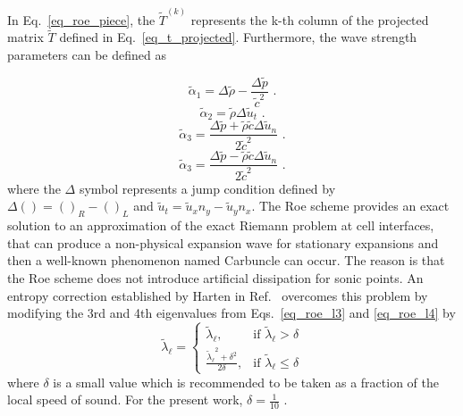 In Eq.\ \ref{eq_roe_piece}, the $\tilde{T}^{(k)}$ represents the k-th column of the projected matrix $\tilde{T}$ defined in Eq.\ \ref{eq_t_projected}. Furthermore, the wave strength parameters can be defined as

\begin{equation}
    \label{eq_roe_alpha_1}
    \tilde{\alpha}_{1} = \Delta \tilde{\rho} - \frac{\Delta \tilde{p}}{\tilde{c}^2}
    \mbox{ .}
\end{equation}
%
\begin{equation}
    \label{eq_roe_alpha_2}
    \tilde{\alpha}_{2} = \tilde{\rho} \Delta \tilde{u}_t
    \mbox{ .}
\end{equation}
%
\begin{equation}
    \label{eq_roe_alpha_3}
    \tilde{\alpha}_{3} = \frac{\Delta \tilde{p} + \tilde{\rho} \tilde{c} \Delta \tilde{u}_n}{2 \tilde{c}^2}
    \mbox{ .}
\end{equation}
%
\begin{equation}
    \label{eq_roe_alpha_4}
    \tilde{\alpha}_{3} = \frac{\Delta \tilde{p} - \tilde{\rho} \tilde{c} \Delta \tilde{u}_n}{2 \tilde{c}^2}
    \mbox{ .}
\end{equation}
where the $\Delta$ symbol represents a jump condition defined by $\Delta() = ()_R - ()_L$ and $\tilde{u}_t = \tilde{u}_x n_y - \tilde{u}_y n_x$. The Roe scheme provides an exact solution to an approximation of the exact Riemann problem at cell interfaces, that can produce a non-physical expansion wave for stationary expansions and then a well-known phenomenon named Carbuncle can occur. The reason is that the Roe scheme does not introduce artificial dissipation for sonic points. An entropy correction established by Harten in Ref.\ \cite{Harten1983} overcomes this problem by modifying the 3rd and 4th eigenvalues from Eqs.\ \ref{eq_roe_l3} and \ref{eq_roe_l4} by 
%
\begin{equation}
    \label{eq_harten_entropy}
    \tilde{\lambda}_{\ell} = 
    \begin{cases}
    	\tilde{\lambda}_{\ell},                                               & \mbox{if }  \tilde{\lambda}_{\ell} > \delta \\
    	\frac{{\tilde{\lambda}_{\ell}}^2 + \delta^2}{2\delta},  & \mbox{if }  \tilde{\lambda}_{\ell} \leq \delta
    \end{cases}    
\end{equation}
where $\delta$ is a small value which is recommended to be taken as a fraction of the local speed of sound. For the present work, $\delta = \frac{1}{10}$ \cite{Blazek2001}.

